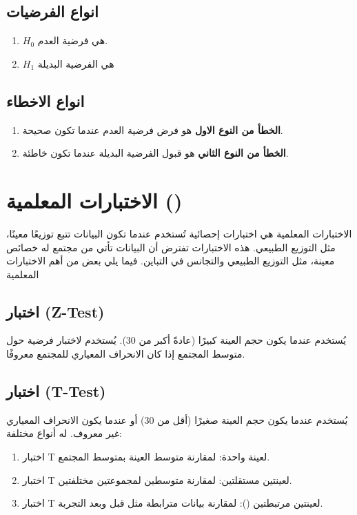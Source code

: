 \subsection{انواع الفرضيات}

\begin{enumerate}
	\item $H_0$ هي فرضية العدم.
	\item $H_1$ هي الفرضية البديلة
\end{enumerate}

\subsection{انواع الاخطاء}
\begin{enumerate}
	\item \textbf{الخطأ من النوع الاول} هو فرض فرضية العدم عندما تكون صحيحة.
	\item \textbf{الخطأ من النوع الثاني} هو قبول الفرضية البديلة عندما تكون خاطئة.
\end{enumerate}

\section{الاختبارات المعلمية  ()}
الاختبارات المعلمية هي اختبارات إحصائية تُستخدم عندما تكون البيانات تتبع توزيعًا معينًا، مثل التوزيع الطبيعي. هذه الاختبارات تفترض أن البيانات تأتي من مجتمع له خصائص معينة، مثل التوزيع الطبيعي والتجانس في التباين. فيما يلي بعض من أهم الاختبارات المعلمية

\subsection{اختبار (Z-Test)}
يُستخدم عندما يكون حجم العينة كبيرًا (عادةً أكبر من 30).
يُستخدم لاختبار فرضية حول متوسط المجتمع إذا كان الانحراف المعياري للمجتمع معروفًا.

\subsection{اختبار (T-Test)}
يُستخدم عندما يكون حجم العينة صغيرًا (أقل من 30) أو عندما يكون الانحراف المعياري غير معروف.
له أنواع مختلفة: 
\begin{enumerate}
\item  	اختبار T لعينة واحدة: لمقارنة متوسط العينة بمتوسط المجتمع.
\item  	اختبار T لعينتين مستقلتين: لمقارنة متوسطين لمجموعتين مختلفتين.
\item  	اختبار T لعينتين مرتبطتين (): لمقارنة بيانات مترابطة مثل قبل وبعد التجربة.
\end{enumerate}

